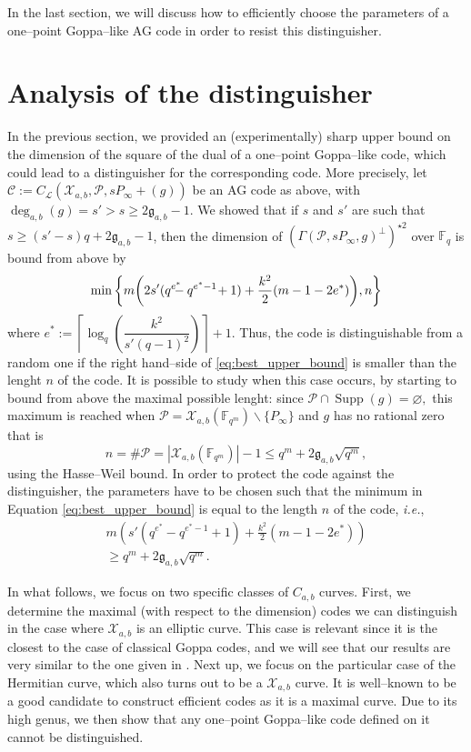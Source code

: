 \documentclass[journal]{IEEEtran}
\theoremstyle{plain}
\theoremstyle{definition}
\theoremstyle{remark}
\newcommand{\calP}{\mathcal{P}}
\newcommand{\calL}{\mathcal{L}}
\newcommand{\calC}{\mathcal{C}}
\newcommand{\calX}{\mathcal{X}}
\newcommand{\fqm}{\mathbb{F}_{q^m}}
\newcommand{\fq}{\mathbb{F}_{q}}
\newcommand{\Supp}{\operatorname{Supp}}
\newcommand{\degab}[1]{\deg_{a,b}\left(#1\right)}
\begin{document}
	In the last section, we will discuss how to efficiently choose the parameters of a one--point Goppa--like AG code in order to resist this distinguisher.
	
	\section{Analysis of the distinguisher}\label{sec:analysis}
	
	In the previous section, we provided an (experimentally) sharp upper bound on the dimension of the square of the dual of a one--point Goppa--like code, which could lead to a distinguisher for the corresponding code. More precisely, let $\calC := C_\calL(\calX_{a,b},\calP,sP_\infty +(g))$ be an AG code as above, with $\degab{g} = s'>s\geq 2\mathfrak{g}_{a,b}-1$. We showed that if $s$ and $s'$ are such that $s \geq (s'-s)q+2\mathfrak{g}_{a,b}-1$, then the dimension of $(\Gamma(\calP,sP_\infty,g)^{\perp})^{\star 2}$ over $\fq$ is bound from above by
	\begin{equation} \label{eq:best_upper_bound}
		\min \left\{m\!\left(2s'(q^{\mathrlap{e^*}}-q^{e^*-1}\!+1)+\frac{k^2}{2}(m-1-2e^*)  \right)\!,n\right\}
	\end{equation}
	where $e^* := \left\lceil \log_q\left(\dfrac{k^2}{s'(q-1)^2}\right)\right\rceil+1$. Thus, the code is distinguishable from a random one if the right hand--side of \eqref{eq:best_upper_bound} is smaller than the lenght $n$ of the code. It is possible to study when this case occurs, by starting to bound from above the maximal possible lenght: since $\calP \cap \Supp(g) = \varnothing,$ this maximum is reached when $\calP = \calX_{a,b}(\fqm) \backslash \{P_\infty\}$ and $g$ has no rational zero that is
	$$n = \# \calP = |\calX_{a,b}(\fqm)|-1 \leq q^m+2\mathfrak{g}_{a,b}\sqrt{q^m},$$
	using the Hasse--Weil bound. In order to protect the code against the distinguisher, the parameters have to be chosen such that the minimum in Equation \eqref{eq:best_upper_bound} is equal to the length $n$ of the code, \textit{i.e.}, 
	\begin{multline} \label{eq:cond_not_to_distinguish}
		m\left(s'(q^{e^*}-q^{e^*-1}+1)+\frac{k^2}{2}(m-1-2e^*)  \right)\\
		\geq q^m+2\mathfrak{g}_{a,b}\sqrt{q^m}.
	\end{multline}
	
	In what follows, we focus on two specific classes of $C_{a,b}$ curves. First, we determine the maximal (with respect to the dimension) codes we can distinguish in the case where $\calX_{a,b}$ is an elliptic curve. This case is relevant since it is the closest to the case of classical Goppa codes, and we will see that our results are very similar to the one given in \cite{MT21}. Next up, we focus on the particular case of the Hermitian curve, which also turns out to be a $\calX_{a,b}$ curve. It is well--known to be a good candidate to construct efficient codes as it is a maximal curve. Due to its high genus, we then show that any one--point Goppa--like code defined on it cannot be distinguished.
	
\end{document}

